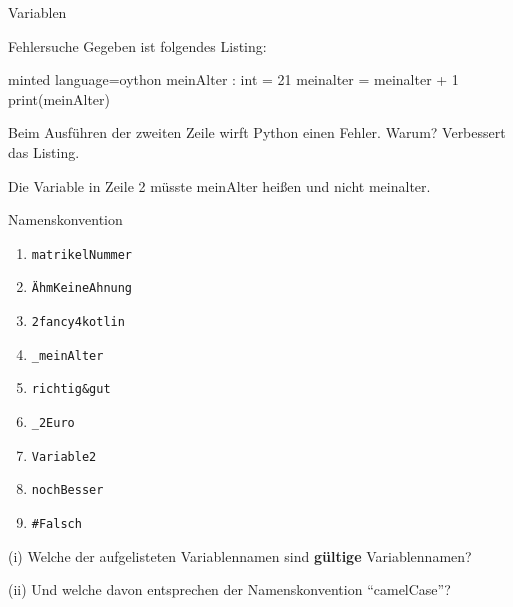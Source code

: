 \begin{task}[points=auto]{Variablen }
    \begin{subtask*}[points=0]{Fehlersuche}
        Gegeben ist folgendes Listing:
        \begin{codeBlock}[]{minted language=oython}
            meinAlter : int = 21
            meinalter = meinalter + 1
            print(meinAlter)
        \end{codeBlock}
        Beim Ausführen der zweiten Zeile wirft Python einen Fehler. Warum? Verbessert das Listing.
        \begin{solution}
            Die Variable in Zeile 2 müsste {\ttfamily meinAlter} heißen und nicht {\ttfamily meinalter}.
        \end{solution}
    \end{subtask*}
    \begin{subtask*}[points=0]{Namenskonvention}
        \begin{multicols}{3}
            \begin{enumerate}[label=(\alph*)]
                \item \texttt{matrikelNummer}
                \item \texttt{ÄhmKeineAhnung}
                \item \texttt{2fancy4kotlin}
                \item \texttt{_meinAlter}
                \item \texttt{richtig&gut}
                \item \texttt{_2Euro}
                \item \texttt{Variable2}
                \item \texttt{nochBesser}
                \item \texttt{#Falsch}
            \end{enumerate}
        \end{multicols}
        (i) Welche der aufgelisteten Variablennamen sind \textbf{gültige} Variablennamen?

        (ii) Und welche davon entsprechen der Namenskonvention \enquote{camelCase}?
\end{subtask*}
\end{task}
